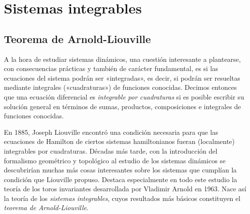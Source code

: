 \chapter{Sistemas integrables}
\section{Teorema de Arnold-Liouville}\label{sec:arnoldliouville}
A la hora de estudiar sistemas dinámicos, una cuestión interesante a plantearse, con consecuencias prácticas y también de carácter fundamental, es si las ecuaciones del sistema podrán ser «integradas», es decir, si podrán ser resueltas mediante integrales («cua\-dra\-tu\-ras») de funciones conocidas. Decimos entonces que una ecuación diferencial es \emph{integrable por cuadraturas} si es posible escribir su solución general en términos de sumas, productos, composiciones e integrales de funciones conocidas. 

En 1885, Joseph Liouville encontró una condición necesaria para que las ecuaciones de Hamilton de ciertos sistemas hamiltonianos fueran (localmente) integrables por cuadraturas. Décadas más tarde, con la introducción del formalismo geométrico y topológico al estudio de los sistemas dinámicos se descubrirían muchas más cosas interesantes sobre los sistemas que cumplían la condición que Liouville propuso. Destaca especialmente en todo este estudio la teoría de los toros invariantes desarrollada por Vladimir Arnold en 1963. Nace así la teoría de los \emph{sistemas integrables}, cuyos resultados más básicos constituyen el \emph{teorema de Arnold-Liouville}.

